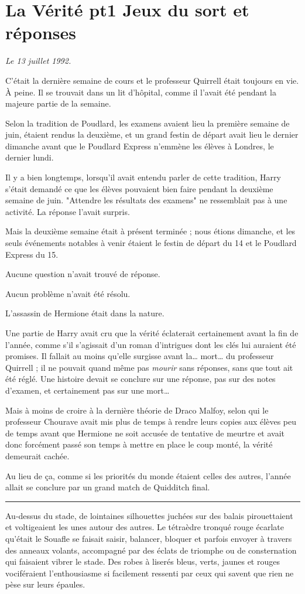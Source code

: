 
\chapter{La Vérité pt1   Jeux du sort et réponses}

\emph{Le 13 juillet 1992.} 

C'était la dernière semaine de cours et le professeur Quirrell était toujours en vie. À peine. Il se trouvait dans un lit d'hôpital, comme il l'avait été pendant la majeure partie de la semaine.

Selon la tradition de Poudlard, les examens avaient lieu la première semaine de juin, étaient rendus la deuxième, et un grand festin de départ avait lieu le dernier dimanche avant que le Poudlard Express n'emmène les élèves à Londres, le dernier lundi.

Il y a bien longtemps, lorsqu'il avait entendu parler de cette tradition, Harry s'était demandé ce que les élèves pouvaient bien faire pendant la deuxième semaine de juin. "Attendre les résultats des examens" ne ressemblait pas à une activité. La réponse l'avait surpris.

Mais la deuxième semaine était à présent terminée ; nous étions dimanche, et les seuls événements notables à venir étaient le festin de départ du 14 et le Poudlard Express du 15.

Aucune question n'avait trouvé de réponse.

Aucun problème n'avait été résolu.

L'assassin de Hermione était dans la nature.

Une partie de Harry avait cru que la vérité éclaterait certainement avant la fin de l'année, comme s'il s'agissait d'un roman d'intrigues dont les clés lui auraient été promises. Il fallait au moins qu'elle surgisse avant la… mort… du professeur Quirrell ; il ne pouvait quand même pas \emph{mourir}  sans réponses, sans que tout ait été réglé. Une histoire devait se conclure sur une réponse, pas sur des notes d'examen, et certainement pas sur une mort…

Mais à moins de croire à la dernière théorie de Draco Malfoy, selon qui le professeur Chourave avait mis plus de temps à rendre leurs copies aux élèves peu de temps avant que Hermione ne soit accusée de tentative de meurtre et avait donc forcément passé son temps à mettre en place le coup monté, la vérité demeurait cachée.

Au lieu de ça, comme si les priorités du monde étaient celles des autres, l'année allait se conclure par un grand match de Quidditch final.
\par\noindent\rule{\textwidth}{0.4pt}
Au-dessus du stade, de lointaines silhouettes juchées sur des balais pirouettaient et voltigeaient les unes autour des autres. Le tétraèdre tronqué rouge écarlate qu'était le Souafle se faisait saisir, balancer, bloquer et parfois envoyer à travers des anneaux volants, accompagné par des éclats de triomphe ou de consternation qui faisaient vibrer le stade. Des robes à liserés bleus, verts, jaunes et rouges vociféraient l'enthousiasme si facilement ressenti par ceux qui savent que rien ne pèse sur leurs épaules.

